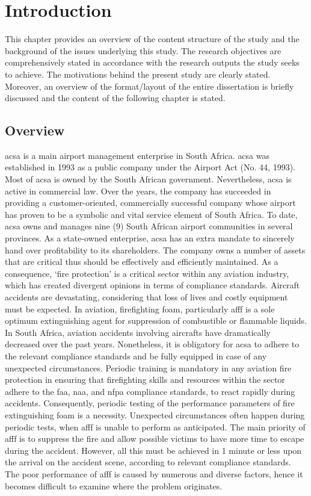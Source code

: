 \chapter{Introduction}
This chapter provides an overview of the content structure of the study and the background of the issues underlying this study. The research objectives are comprehensively stated in accordance with the research outputs the study seeks to achieve. The motivations behind the present study are clearly stated. Moreover, an overview of the format/layout of the entire dissertation is briefly discussed and the content of the following chapter is stated. 

\section{Overview}
\acrfull{acsa} is a main airport management enterprise in South Africa. \acrshort{acsa} was established in 1993 as a public company under the Airport Act (No. 44, 1993). Most of \acrshort{acsa} is owned by the South African government. Nevertheless, \acrshort{acsa} is active in commercial law. Over the years, the company has succeeded in providing a customer-oriented, commercially successful company whose airport has proven to be a symbolic and vital service element of South Africa. To date, \acrshort{acsa} owns and manages nine (9) South African airport communities in several provinces. As a state-owned enterprise, \acrshort{acsa} has an extra mandate to sincerely hand over profitability to its shareholders.
The company owns a number of assets that are critical thus should be effectively and efficiently maintained. As a consequence, ‘fire protection’ is a critical sector within any aviation industry, which has created divergent opinions in terms of compliance standards. Aircraft accidents are devastating, considering that loss of lives and costly equipment must be expected. In aviation, firefighting foam, particularly \acrfull{afff} is a sole optimum extinguishing agent for suppression of combustible or flammable liquids. In South Africa, aviation accidents involving aircrafts have dramatically decreased over the past years. Nonetheless, it is obligatory for \acrshort{acsa} to adhere to the relevant compliance standards and be fully equipped in case of any unexpected circumstances.
Periodic training is mandatory in any aviation fire protection in ensuring that firefighting skills and resources within the sector adhere to the \acrfull{faa}, \acrfull{naa}, and \acrfull{nfpa} compliance standards, to react rapidly during accidents. Consequently, periodic testing of the performance parameters of fire extinguishing foam is a necessity. Unexpected circumstances often happen during periodic tests, when \acrshort{afff} is unable to perform as anticipated. The main priority of \acrshort{afff} is to suppress the fire and allow possible victims to have more time to escape during the accident. However, all this must be achieved in 1 minute or less upon the arrival on the accident scene, according to relevant compliance standards. The poor performance of \acrshort{afff} is caused by numerous and diverse factors, hence it becomes difficult to examine where the problem originates.
